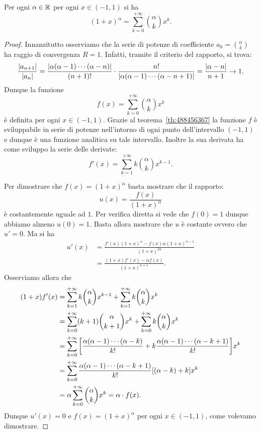\begin{theorem}
\label{th:serie_binomiale}%
Per ogni $\alpha\in \mathbb R$ per ogni $x\in (-1,1)$ si ha
\[
  (1+x)^{\alpha}  = \sum_{k=0}^{+\infty} {\alpha \choose k} x^k.
\]
\end{theorem}
%
\begin{proof}
Innanzitutto osserviamo che la serie di potenze di coefficiente
$a_k = {\alpha \choose k}$ ha raggio di convergenza $R=1$.
Infatti, tramite il criterio del rapporto, si trova:
\[
  \frac{{\left|a_{n+1}\right|}}{{\left|a_n\right|}}
  = \frac{{\left|\alpha (\alpha-1) \cdots (\alpha-n)\right|}}{(n+1)!}
  \cdot \frac{n!}{{\left|\alpha(\alpha-1) \cdots (\alpha-n+1)\right|}}
  = \frac{{\left|\alpha-n\right|}}{n+1} \to 1.
\]
Dunque la funzione
\[
 f(x) = \sum_{k=0}^{+\infty} {\alpha \choose k} x^k
\]
è definita per ogni $x\in(-1,1)$.
Grazie al teorema~\ref{th:488456367} la funzione $f$ è sviluppabile
in serie di potenze nell'intorno di ogni punto dell'intervallo $(-1,1)$
e dunque è una funzione analitica su tale intervallo. Inoltre la sua
derivata ha come sviluppo la serie delle derivate:
\[
  f'(x) = \sum_{k=1}^{+\infty} k {\alpha \choose k} x^{k-1}.
\]

Per dimostrare che $f(x) = (1+x)^\alpha$ basta mostrare che il rapporto:
\[
  u(x) = \frac{f(x)}{(1+x)^\alpha}
\]
è costantemente uguale ad $1$. Per verifica diretta si vede che $f(0)=1$
dunque abbiamo almeno $u(0) = 1$. Basta allora mostrare che $u$ è costante
ovvero che $u'=0$. Ma si ha
\begin{align*}
  u'(x)
  &= \frac{f'(x) (1+x)^\alpha - f(x) \alpha (1+x)^{\alpha-1}}{(1+x)^{2\alpha}} \\
  &= \frac{(1+x) f'(x) - \alpha f(x)}{(1+x)^{\alpha+1}}.
\end{align*}
Osserviamo allora che
\begin{align*}
(1+x)f'(x)
&= \sum_{k=1}^{+\infty} k{\alpha \choose k} x^{k-1}
+ \sum_{k=1}^{+\infty} k{\alpha \choose k} x^{k}\\
&= \sum_{k=0}^{+\infty} (k+1){\alpha \choose k+1} x^k
+ \sum_{k=0}^{+\infty} k {\alpha \choose k} x^k \\
&= \sum_{k=0}^{+\infty} {\left[ \frac{\alpha(\alpha-1) \cdots (\alpha-k)}{k!}
 + k \frac{\alpha(\alpha-1)\cdots(\alpha-k+1)}{k!} \right]} x^k \\
 &= \sum_{k=0}^{+\infty} \frac{\alpha(\alpha-1)\cdots(\alpha-k+1)}{k!}{\left[ (\alpha-k)+k \right]} x^k\\
 &= \alpha \sum_{k=0}^{+\infty} {\alpha \choose k} x^k = \alpha \cdot f(x).
\end{align*}
Dunque $u'(x)=0$ e $f(x) = (1+x)^\alpha$ per ogni $x\in(-1,1)$, come
volevamo dimostrare.
\end{proof}

